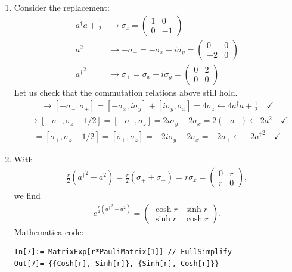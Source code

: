 \documentclass{article}
\theoremstyle{definition}
\newcommand{\f}[2]{\frac{#1}{#2}}
\newcommand{\lp}{\left(}
\newcommand{\rp}{\right)}
\begin{document}
\begin{enumerate}[label=(\alph*)]
\item Consider the replacement:
\begin{align*}
a^\dagger a + \f{1}{2} 
&\to \sigma_z = 
\begin{pmatrix}
1 & 0 \\ 0 & -1 
\end{pmatrix} \\
a^2 
&\to -\sigma_- 
= -\sigma_x +  i\sigma_y 
= 
\begin{pmatrix}
0 & 0 \\ -2 & 0
\end{pmatrix} \\
{a^\dagger}^2
&\to \sigma_+ = \sigma_x + i\sigma_y = 
\begin{pmatrix}
0 & 2 \\ 0 & 0
\end{pmatrix}
\end{align*}
Let us check that the commutation relations above still hold. 
\begin{align*}
[a^2, {a^\dagger}^2]
\to
[-\sigma_-, \sigma_+] 
=
[-\sigma_x, i\sigma_y]  + [i\sigma_y, \sigma_x] = 4\sigma_z \leftarrow 4a^\dagger a + \f{1}{2}  \quad \checkmark
\end{align*}
\begin{align*}
[a^2, a^\dagger a] 
\to 
[-\sigma_-, \sigma_z - 1/2] = [-\sigma_-, \sigma_z] 
= 
2i\sigma_y -2\sigma_x = 2(-\sigma_-) \leftarrow 2 a^2 \quad \checkmark
\end{align*}
\begin{align*}
[{a^\dagger}^2, a^\dagger a] 
=
[\sigma_+, \sigma_z - 1/2] = [\sigma_+, \sigma_z]
=
-2i\sigma_y -2 \sigma_x = -2 \sigma_+  \leftarrow  -2 {a^\dagger}^2 \quad \checkmark
\end{align*}


\item With
\begin{align*}
\f{r}{2}\lp {a^\dagger}^2 - a^2 \rp = \f{r}{2}(\sigma_+  + \sigma_-) = r\sigma_x = \begin{pmatrix}
0 & r \\ r& 0
\end{pmatrix},
\end{align*}
we find 
\begin{align*}
e^{\f{r}{2}\lp {a^\dagger}^2 - a^2 \rp } = \begin{pmatrix}
\cosh r & \sinh r \\ \sinh r & \cosh r
\end{pmatrix}.
\end{align*}
Mathematica code:
\begin{lstlisting}
In[7]:= MatrixExp[r*PauliMatrix[1]] // FullSimplify
Out[7]= {{Cosh[r], Sinh[r]}, {Sinh[r], Cosh[r]}}
\end{lstlisting}



\end{enumerate}
\end{document}
